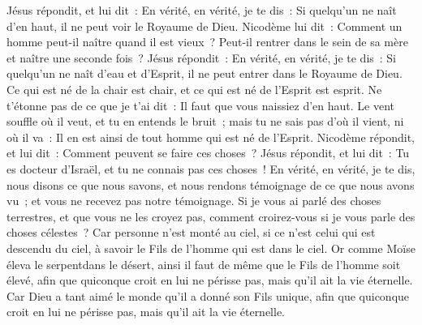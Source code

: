 \begin{multicols}{2}
Jésus répondit, et lui dit~: En vérité, en vérité, je te dis~: Si quelqu'un ne naît d'en haut, il ne peut voir le Royaume de Dieu.
Nicodème lui dit~: Comment un homme peut-il naître quand il est vieux~? Peut-il rentrer dans le sein de sa mère et naître une seconde fois~?
Jésus répondit~: En vérité, en vérité, je te dis~: Si quelqu'un ne naît d'eau et d'Esprit, il ne peut entrer dans le Royaume de Dieu.
Ce qui est né de la chair est chair, et ce qui est né de l'Esprit est esprit.
Ne t'étonne pas de ce que je t'ai dit~: Il faut que vous naissiez d'en haut.
Le vent souffle où il veut, et tu en entends le bruit~; mais tu ne sais pas d'où il vient, ni où il va~: Il en est ainsi de tout homme qui est né de l'Esprit.
Nicodème répondit, et lui dit~: Comment peuvent se faire ces choses~?
Jésus répondit, et lui dit~: Tu es docteur d'Israël, et tu ne connais pas ces choses~!
En vérité, en vérité, je te dis, nous disons ce que nous savons, et nous rendons témoignage de ce que nous avons vu~; et vous ne recevez pas notre témoignage.
Si je vous ai parlé des choses terrestres, et que vous ne les croyez pas, comment croirez-vous si je vous parle des choses célestes~?
Car personne n'est monté au ciel, si ce n'est celui qui est descendu du ciel, à savoir le Fils de l'homme qui est dans le ciel.
Or comme Moïse éleva le serpentdans le désert, ainsi il faut de même que le Fils de l'homme soit élevé,
afin que quiconque croit en lui ne périsse pas, mais qu'il ait la vie éternelle.
Car Dieu a tant aimé le monde qu'il a donné son Fils unique, afin que quiconque croit en lui ne périsse pas, mais qu'il ait la vie éternelle.

\end{multicols}
